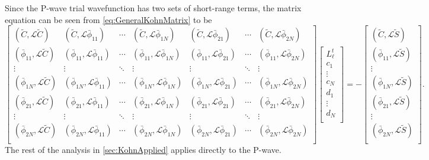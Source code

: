 \documentclass[Dissertation.tex]{subfiles}
\begin{document}
Since the P-wave trial wavefunction has two sets of short-range terms, the matrix equation can be seen from \cref{eq:GeneralKohnMatrix} to be
{\small
\begin{equation}
\label{eq:PWaveKohnMatrix}
	\begin{bmatrix} 
	 (\widetilde{C},\mathcal{L}\widetilde{C}) & (\widetilde{C},\mathcal{L}\bar{\phi}_{11}) & \cdots & (\widetilde{C},\mathcal{L}\bar{\phi}_{1N}) & (\widetilde{C},\mathcal{L}\bar{\phi}_{21}) & \cdots & (\widetilde{C},\mathcal{L}\bar{\phi}_{2N})\\
	 (\bar{\phi}_{11},\mathcal{L}\widetilde{C}) & (\bar{\phi}_{11},\mathcal{L}\bar{\phi}_{11}) & \cdots & (\bar{\phi}_{11},\mathcal{L}\bar{\phi}_{1N}) & (\bar{\phi}_{11},\mathcal{L}\bar{\phi}_{21}) & \cdots & (\bar{\phi}_{11},\mathcal{L}\bar{\phi}_{2N})\\
	 \vdots & \vdots & \ddots & \vdots & \vdots & \ddots & \vdots \\
	 (\bar{\phi}_{1N},\mathcal{L}\widetilde{C}) & (\bar{\phi}_{1N},\mathcal{L}\bar{\phi}_{11}) & \cdots & (\bar{\phi}_{1N},\mathcal{L}\bar{\phi}_{1N}) & (\bar{\phi}_{1N},\mathcal{L}\bar{\phi}_{21}) & \cdots & (\bar{\phi}_{1N},\mathcal{L}\bar{\phi}_{2N})\\
	 (\bar{\phi}_{21},\mathcal{L}\widetilde{C}) & (\bar{\phi}_{21},\mathcal{L}\bar{\phi}_{11}) & \cdots & (\bar{\phi}_{21},\mathcal{L}\bar{\phi}_{1N}) & (\bar{\phi}_{21},\mathcal{L}\bar{\phi}_{21}) & \cdots & (\bar{\phi}_{21},\mathcal{L}\bar{\phi}_{2N})\\
	 \vdots & \vdots & \ddots & \vdots & \vdots & \ddots & \vdots \\
	 (\bar{\phi}_{2N},\mathcal{L}\widetilde{C}) & (\bar{\phi}_{2N},\mathcal{L}\bar{\phi}_{11}) & \cdots & (\bar{\phi}_{2N},\mathcal{L}\bar{\phi}_{1N}) & (\bar{\phi}_{2N},\mathcal{L}\bar{\phi}_{21}) & \cdots & (\bar{\phi}_{2N},\mathcal{L}\bar{\phi}_{2N})\\
	\end{bmatrix}
	\begin{bmatrix}
  L_\ell^t\\
	c_1\\
	\vdots\\
	c_N\\
	d_1\\
	\vdots\\
	d_N\\
	\end{bmatrix}
	= -
	\begin{bmatrix}
	(\widetilde{C},\mathcal{L}\widetilde{S}) \\
	(\bar{\phi}_{11},\mathcal{L}\widetilde{S}) \\
	\vdots \\
	(\bar{\phi}_{1N},\mathcal{L}\widetilde{S}) \\
	(\bar{\phi}_{21},\mathcal{L}\widetilde{S}) \\
	\vdots \\
	(\bar{\phi}_{2N},\mathcal{L}\widetilde{S}) \\
	\end{bmatrix}.
\end{equation}
}
The rest of the analysis in \cref{sec:KohnApplied} applies directly to the P-wave.
\end{document}
